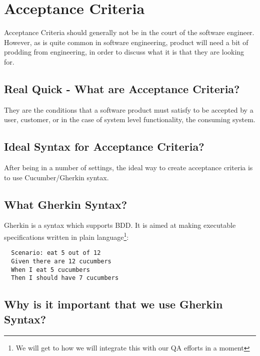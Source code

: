 \maketitle{}
\section{ Acceptance Criteria }
Acceptance Criteria should generally not be in the court of the software
engineer. However, as is quite common in software engineering, product will
need a bit of prodding from engineering, in order to discuss what it is that
they are looking for.

\subsection{ Real Quick - What are Acceptance Criteria? }
They are the conditions that a software product must satisfy to be accepted by
a user, customer, or in the case of system level functionality, the consuming
system.

\subsection{ Ideal Syntax for Acceptance Criteria? }
After being in a number of settings, the ideal way to create acceptance criteria
is to use Cucumber/Gherkin syntax.

\subsection{ What Gherkin Syntax? }
Gherkin is a syntax which supports BDD. It is aimed at making executable
specifications written in plain language\footnote{We will get to how we will
integrate this with our QA efforts in a moment}:
\begin{verbatim}
  Scenario: eat 5 out of 12
  Given there are 12 cucumbers
  When I eat 5 cucumbers
  Then I should have 7 cucumbers
\end{verbatim}

\subsection{ Why is it important that we use Gherkin Syntax? }
